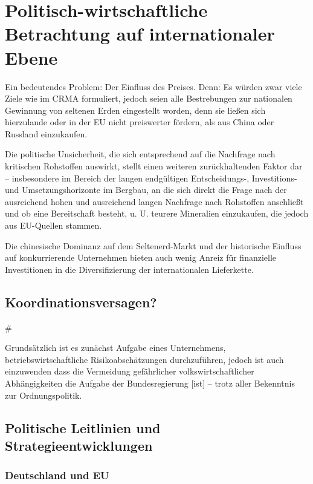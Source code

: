 \documentclass[12pt,a4paper,oneside]{book} %
\begin{document}

\chapter{Politisch-wirtschaftliche Betrachtung auf internationaler Ebene}



Ein bedeutendes Problem: Der Einfluss des Preises. Denn: Es würden zwar viele Ziele wie im CRMA formuliert, jedoch seien alle Bestrebungen zur nationalen Gewinnung von seltenen Erden eingestellt worden, denn sie ließen sich \glqq hierzulande oder in der EU nicht preiswerter fördern, als aus China oder Russland einzukaufen\grqq.\autocite{VDI Nachrichten: Seltene Erden: Deutschland importiert lieber, als selbst zu fördern}

Die politische Unsicherheit, die sich entsprechend auf die Nachfrage nach kritischen Rohstoffen auswirkt, stellt einen weiteren zurückhaltenden Faktor dar -- insbesondere im Bereich der langen endgültigen Entscheidungs-, Investitions- und Umsetzungshorizonte im Bergbau, an die sich direkt die Frage nach der ausreichend hohen und ausreichend langen Nachfrage nach Rohstoffen anschließt und ob eine Bereitschaft besteht, u. U. teurere Mineralien einzukaufen, die jedoch aus EU-Quellen stammen.

Die chinesische Dominanz auf dem Seltenerd-Markt und der historische Einfluss auf konkurrierende Unternehmen bieten auch wenig Anreiz für finanzielle Investitionen in die Diversifizierung der internationalen Lieferkette.

\section{Koordinationsversagen?}#

Grundsätzlich ist es zunächst Aufgabe eines Unternehmens, betriebswirtschaftliche Risikoabschätzungen durchzuführen, jedoch ist auch einzuwenden dass die \glqq Vermeidung gefährlicher volkswirtschaftlicher Abhängigkeiten die Aufgabe der Bundesregierung [ist] -- trotz aller Bekenntnis zur Ordnungspolitik\grqq.\autocite{Wirtschaft fordert mehr Tempo bei Rohstofffonds}

\section{Politische Leitlinien und Strategieentwicklungen}

\subsection{Deutschland und EU}
\end{document}
